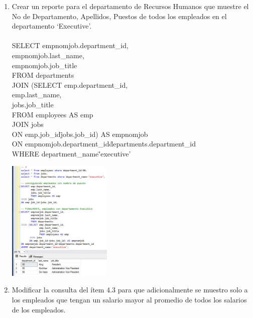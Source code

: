\begin{enumerate}[1.]
	\item Crear un reporte para el departamento de Recursos Humanos que muestre el No de Departamento, Apellidos, Puestos de todos los empleados en el departamento ‘Executive’.
\\
\\SELECT empnomjob.department\_id, \\
	   empnomjob.last\_name, \\
	   empnomjob.job\_title \\
	   FROM departments \\
JOIN (SELECT emp.department\_id, \\
			 emp.last\_name, \\
			 jobs.job\_title \\
			 FROM employees AS emp \\
	  JOIN jobs \\
	  ON emp.job\_id\=jobs.job\_id) AS empnomjob \\
ON empnomjob.department\_id\=departments.department\_id \\
WHERE department\_name\='executive' \\
	\begin{center}
	\includegraphics[width=5cm]{./Imagenes/actividad0907} 
	\end{center}

	\item Modificar la consulta del ítem 4.3 para que adicionalmente se muestro solo a los empleados que tengan un salario mayor al promedio de todos los salarios de los empleados.
\end{enumerate}
